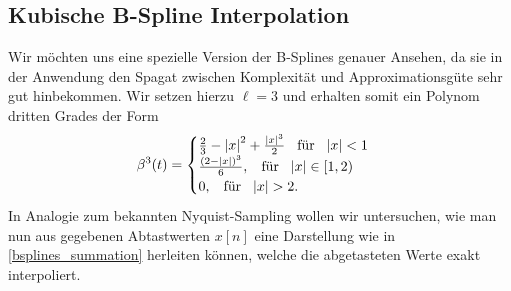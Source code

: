 \subsection{Kubische B-Spline Interpolation}
%
%
Wir m\"ochten uns eine spezielle Version der B-Splines genauer Ansehen, da sie in der Anwendung den Spagat zwischen Komplexit\"at und Approximationsg\"ute sehr gut hinbekommen. Wir setzen hierzu $\ell=3$ und erhalten somit ein Polynom dritten Grades der Form
\begin{equation}
    \beta^3(t) = \begin{cases}
        \frac 23 - {\left| x \right|}^2 + \frac{{\left| x \right|}^3}{2} {\hspace{3mm} \text{f\"ur} \hspace{3mm}} {\left| x \right|} < 1\\
        \frac{(2 - {\left| x \right|})^3}{6}, {\hspace{3mm} \text{f\"ur} \hspace{3mm}} {\left| x \right|} \in [1, 2) \\
        0, {\hspace{3mm} \text{f\"ur} \hspace{3mm}} {\left| x \right|} > 2.
    \end{cases}
\end{equation}
In Analogie zum bekannten Nyquist-Sampling wollen wir untersuchen, wie man nun aus gegebenen Abtastwerten $x[n]$ eine Darstellung wie in \eqref{bsplines_summation} herleiten k\"onnen, welche die abgetasteten Werte exakt interpoliert.